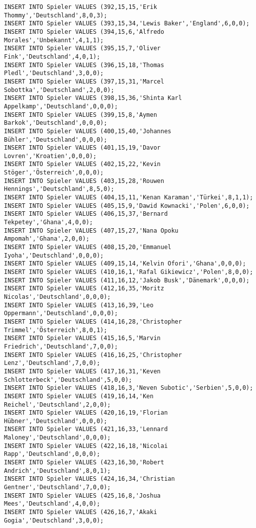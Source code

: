 \documentclass{lehramt-informatik-aufgabe}
\begin{document}
\begin{verbatim}
INSERT INTO Spieler VALUES (392,15,15,'Erik Thommy','Deutschland',8,0,3);
INSERT INTO Spieler VALUES (393,15,34,'Lewis Baker','England',6,0,0);
INSERT INTO Spieler VALUES (394,15,6,'Alfredo Morales','Unbekannt',4,1,1);
INSERT INTO Spieler VALUES (395,15,7,'Oliver Fink','Deutschland',4,0,1);
INSERT INTO Spieler VALUES (396,15,18,'Thomas Pledl','Deutschland',3,0,0);
INSERT INTO Spieler VALUES (397,15,31,'Marcel Sobottka','Deutschland',2,0,0);
INSERT INTO Spieler VALUES (398,15,36,'Shinta Karl Appelkamp','Deutschland',0,0,0);
INSERT INTO Spieler VALUES (399,15,8,'Aymen Barkok','Deutschland',0,0,0);
INSERT INTO Spieler VALUES (400,15,40,'Johannes Bühler','Deutschland',0,0,0);
INSERT INTO Spieler VALUES (401,15,19,'Davor Lovren','Kroatien',0,0,0);
INSERT INTO Spieler VALUES (402,15,22,'Kevin Stöger','Österreich',0,0,0);
INSERT INTO Spieler VALUES (403,15,28,'Rouwen Hennings','Deutschland',8,5,0);
INSERT INTO Spieler VALUES (404,15,11,'Kenan Karaman','Türkei',8,1,1);
INSERT INTO Spieler VALUES (405,15,9,'Dawid Kownacki','Polen',6,0,0);
INSERT INTO Spieler VALUES (406,15,37,'Bernard Tekpetey','Ghana',4,0,0);
INSERT INTO Spieler VALUES (407,15,27,'Nana Opoku Ampomah','Ghana',2,0,0);
INSERT INTO Spieler VALUES (408,15,20,'Emmanuel Iyoha','Deutschland',0,0,0);
INSERT INTO Spieler VALUES (409,15,14,'Kelvin Ofori','Ghana',0,0,0);
INSERT INTO Spieler VALUES (410,16,1,'Rafal Gikiewicz','Polen',8,0,0);
INSERT INTO Spieler VALUES (411,16,12,'Jakob Busk','Dänemark',0,0,0);
INSERT INTO Spieler VALUES (412,16,35,'Moritz Nicolas','Deutschland',0,0,0);
INSERT INTO Spieler VALUES (413,16,39,'Leo Oppermann','Deutschland',0,0,0);
INSERT INTO Spieler VALUES (414,16,28,'Christopher Trimmel','Österreich',8,0,1);
INSERT INTO Spieler VALUES (415,16,5,'Marvin Friedrich','Deutschland',7,0,0);
INSERT INTO Spieler VALUES (416,16,25,'Christopher Lenz','Deutschland',7,0,0);
INSERT INTO Spieler VALUES (417,16,31,'Keven Schlotterbeck','Deutschland',5,0,0);
INSERT INTO Spieler VALUES (418,16,3,'Neven Subotic','Serbien',5,0,0);
INSERT INTO Spieler VALUES (419,16,14,'Ken Reichel','Deutschland',2,0,0);
INSERT INTO Spieler VALUES (420,16,19,'Florian Hübner','Deutschland',0,0,0);
INSERT INTO Spieler VALUES (421,16,33,'Lennard Maloney','Deutschland',0,0,0);
INSERT INTO Spieler VALUES (422,16,18,'Nicolai Rapp','Deutschland',0,0,0);
INSERT INTO Spieler VALUES (423,16,30,'Robert Andrich','Deutschland',8,0,1);
INSERT INTO Spieler VALUES (424,16,34,'Christian Gentner','Deutschland',7,0,0);
INSERT INTO Spieler VALUES (425,16,8,'Joshua Mees','Deutschland',4,0,0);
INSERT INTO Spieler VALUES (426,16,7,'Akaki Gogia','Deutschland',3,0,0);

\end{verbatim}
\end{document}
